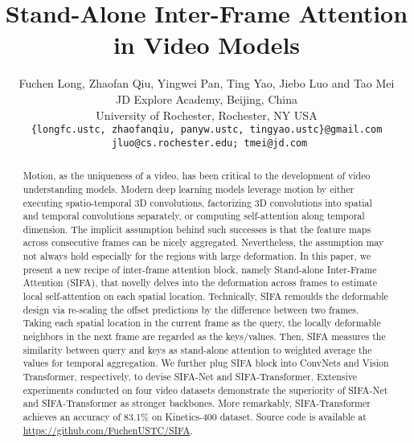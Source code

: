 \documentclass[10pt,twocolumn,letterpaper]{article}
\begin{document}
\title{Stand-Alone Inter-Frame Attention in Video Models}



\author{Fuchen Long, Zhaofan Qiu, Yingwei Pan, Ting Yao, Jiebo Luo and Tao Mei \\
	JD Explore Academy, Beijing, China \\
	University of Rochester, Rochester, NY USA \\
	{\tt\small\{longfc.ustc, zhaofanqiu, panyw.ustc, tingyao.ustc\}@gmail.com} \\
	{\tt\small\ jluo@cs.rochester.edu; tmei@jd.com} \\
}

\maketitle

\begin{abstract}
Motion, as the uniqueness of a video, has been critical to the development of video understanding models. Modern deep learning models leverage motion by either executing spatio-temporal 3D convolutions, factorizing 3D convolutions into spatial and temporal convolutions separately, or computing self-attention along temporal dimension. The implicit assumption behind such successes is that the feature maps across consecutive frames can be nicely aggregated. Nevertheless, the assumption may not always hold especially for the regions with large deformation. In this paper, we present a new recipe of inter-frame attention block, namely Stand-alone Inter-Frame Attention (SIFA), that novelly delves into the deformation across frames to estimate local self-attention on each spatial location. Technically, SIFA remoulds the deformable design via re-scaling the offset predictions by the difference between two frames. Taking each spatial location in the current frame as the query, the locally deformable neighbors in the next frame are regarded as the keys/values. Then, SIFA measures the similarity between query and keys as stand-alone attention to weighted average the values for temporal aggregation. We further plug SIFA block into ConvNets and Vision Transformer, respectively, to devise SIFA-Net and SIFA-Transformer. Extensive experiments conducted on four video datasets demonstrate the superiority of SIFA-Net and SIFA-Transformer as stronger backbones. More remarkably, SIFA-Transformer achieves an accuracy of 83.1\% on Kinetics-400 dataset. Source code is available at \url{https://github.com/FuchenUSTC/SIFA}.
\end{abstract}
\end{document}
